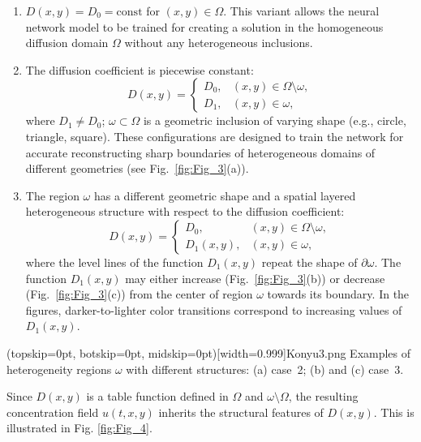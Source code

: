 \documentclass{ieeeaccess}
\begin{document}
\begin{enumerate}
    \item $D(x, y) = D_0 = \mathrm{const}$ for $(x, y) \in \Omega$.  
 This variant allows the neural network model to be trained for creating a solution in the homogeneous diffusion domain $\Omega$ without any heterogeneous inclusions.
    
    \item The diffusion coefficient is piecewise constant:
    $$
    D(x, y) = 
        \begin{cases}
            D_0, & (x, y) \in \Omega \setminus \omega, \\
            D_1, & (x, y) \in \omega,
        \end{cases}
    $$
    where $D_1 \ne D_0$;  $\omega \subset \Omega$ is a geometric inclusion of varying shape (e.g., circle, triangle, square).  
    These configurations are designed to train the network for accurate reconstructing sharp boundaries of heterogeneous domains of different geometries (see Fig.~\ref{fig:Fig_3}(a)).
 
    \item The region $\omega$ has a different geometric shape and a spatial layered heterogeneous structure with respect to the diffusion coefficient:
    $$
    D(x,y) = 
    \begin{cases}
        D_0, & (x,y) \in \Omega \setminus \omega, \\
        D_1(x,y), & (x,y) \in \omega,
    \end{cases}
    $$
      where the level lines of the function $D_1(x,y)$ repeat   the shape of $\partial\omega$. The function $D_1(x,y)$ may either increase (Fig.~\ref{fig:Fig_3}(b)) or decrease (Fig.~\ref{fig:Fig_3}(c)) from the center of region $\omega$ towards its boundary. In the figures, darker-to-lighter color transitions correspond to increasing values of $D_1(x,y)$.
  
\end{enumerate}

\Figure[ht!](topskip=0pt, botskip=0pt, midskip=0pt)[width=0.999\linewidth]{Konyu3.png}
{Examples of heterogeneity regions $\omega$ with different structures: (a) case~2; (b) and (c) case~3.
\label{fig:Fig_3}}

Since $D(x,y)$ is a table function defined in $\Omega$ and $\omega\setminus\Omega$, the resulting concentration field $u(t,x,y)$ inherits the structural features of $D(x,y)$. This is illustrated in Fig. \ref{fig:Fig_4}.
\end{document}
